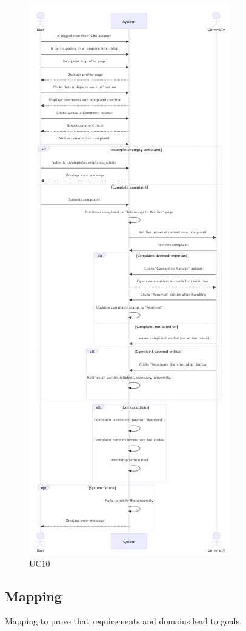 \begin{figure}[H]
    \centering
    \includegraphics[width=0.5\linewidth]{RASD//Images/UC10.png}
    \caption{UC10}
\end{figure}

\pagebreak
\subsection{Mapping}
Mapping to prove that requirements and domains lead to goals.

